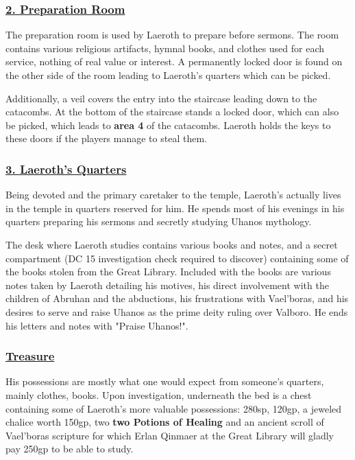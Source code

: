 \begin{multicols*}{2}
\subsubsection*{\underline{2. Preparation Room}}
The preparation room is used by Laeroth to prepare before sermons. The room contains various religious artifacts, hymnal books, and clothes used for each service, nothing of real value or interest. A permanently locked door is found on the other side of the room leading to Laeroth's quarters which can be picked. 

Additionally, a veil covers the entry into the staircase leading down to the catacombs. At the bottom of the staircase stands a locked door, which can also be picked, which leads to \textbf{area 4} of the catacombs. Laeroth holds the keys to these doors if the players manage to steal them. 

\subsubsection*{\underline{3. Laeroth's Quarters}}
Being devoted and the primary caretaker to the temple, Laeroth's actually lives in the temple in quarters reserved for him. He spends most of his evenings in his quarters preparing his sermons and secretly studying Uhanos mythology.
 
The desk where Laeroth studies contains various books and notes, and a secret compartment (DC 15 investigation check required to discover) containing some of the books stolen from the Great Library. Included with the books are various notes taken by Laeroth detailing his motives, his direct involvement with the children of Abruhan and the abductions, his frustrations with Vael'boras, and his desires to serve and raise Uhanos as the prime deity ruling over Valboro. He ends his letters and notes with "Praise Uhanos!".

\subsubsection*{\underline{\textbf{Treasure}}}
His possessions are mostly what one would expect from someone's quarters, mainly clothes, books. Upon investigation, underneath the bed is a chest containing some of Laeroth's more valuable possessions: 280sp, 120gp, a jeweled chalice worth 150gp, two \textbf{two Potions of Healing} and an ancient scroll of Vael'boras scripture for which Erlan Qinmaer at the Great Library will gladly pay 250gp to be able to study.


\end{multicols*}
